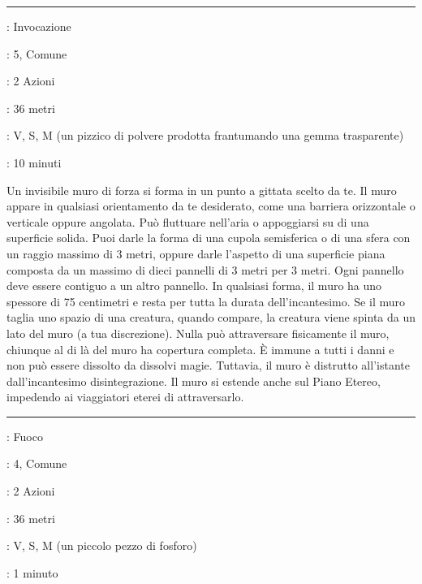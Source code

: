 \begin{multicols}{2}
\smallskip\noindent\rule{\linewidth}{2pt} \hypertarget{Muro di Forza}{}\smallskip{}
\noindent
\begin{description}[noitemsep, topsep=0pt, parsep=0pt, partopsep=0pt, leftmargin=0cm, labelwidth=2.8cm]
	\item[\textbf{Lista di Magia}]: Invocazione
	\item[\textbf{Livello}]: 5, Comune
	\item[\textbf{T. di Lancio}]: 2 Azioni
	\item[\textbf{Gittata}]: 36 metri
	\item[\textbf{Componenti}]: V, S, M (un pizzico di polvere prodotta frantumando una gemma trasparente)
	\item[\textbf{Durata}]: 10 minuti
\end{description}

Un invisibile muro di forza si forma in un punto a gittata scelto da te. Il muro appare in qualsiasi orientamento da te desiderato, come una barriera orizzontale o verticale oppure angolata. Può fluttuare nell'aria o appoggiarsi su di una superficie solida. Puoi darle la forma di una cupola semisferica o di una sfera con un raggio massimo di 3 metri, oppure darle l'aspetto di una superficie piana composta da un massimo di dieci pannelli di 3 metri per 3 metri. Ogni pannello deve essere contiguo a un altro pannello. In qualsiasi forma, il muro ha uno spessore di 75 centimetri e resta per tutta la durata dell'incantesimo. Se il muro taglia uno spazio di una creatura, quando compare, la creatura viene spinta da un lato del muro (a tua discrezione). Nulla può attraversare fisicamente il muro, chiunque al di là del muro ha copertura completa. È immune a tutti i danni e non può essere dissolto da dissolvi magie. Tuttavia, il muro è distrutto all'istante dall'incantesimo disintegrazione. Il muro si estende anche sul Piano Etereo, impedendo ai viaggiatori eterei di attraversarlo.

\smallskip\noindent\rule{\linewidth}{2pt} \hypertarget{Muro di Fuoco}{}\smallskip{}
\noindent
\begin{description}[noitemsep, topsep=0pt, parsep=0pt, partopsep=0pt, leftmargin=0cm, labelwidth=2.8cm]
	\item[\textbf{Lista di Magia}]: Fuoco
	\item[\textbf{Livello}]: 4, Comune
	\item[\textbf{T. di Lancio}]: 2 Azioni
	\item[\textbf{Gittata}]: 36 metri
	\item[\textbf{Componenti}]: V, S, M (un piccolo pezzo di fosforo)
	\item[\textbf{Durata}]: 1 minuto
\end{description}


\end{multicols}
